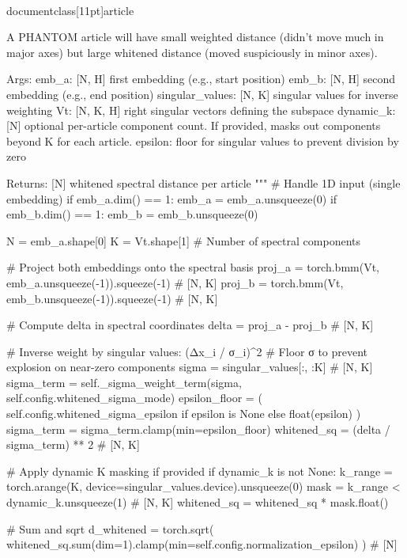 \\documentclass[11pt]{article}
\begin{document}
\begin{CodeBlock}
        A PHANTOM article will have small weighted distance (didn't move much in
        major axes) but large whitened distance (moved suspiciously in minor axes).

        Args:
            emb_a: [N, H] first embedding (e.g., start position)
            emb_b: [N, H] second embedding (e.g., end position)
            singular_values: [N, K] singular values for inverse weighting
            Vt: [N, K, H] right singular vectors defining the subspace
            dynamic_k: [N] optional per-article component count. If provided,
                       masks out components beyond K for each article.
            epsilon: floor for singular values to prevent division by zero

        Returns:
            [N] whitened spectral distance per article
        """
        # Handle 1D input (single embedding)
        if emb_a.dim() == 1:
            emb_a = emb_a.unsqueeze(0)
        if emb_b.dim() == 1:
            emb_b = emb_b.unsqueeze(0)

        N = emb_a.shape[0]
        K = Vt.shape[1]  # Number of spectral components

        # Project both embeddings onto the spectral basis
        proj_a = torch.bmm(Vt, emb_a.unsqueeze(-1)).squeeze(-1)  # [N, K]
        proj_b = torch.bmm(Vt, emb_b.unsqueeze(-1)).squeeze(-1)  # [N, K]

        # Compute delta in spectral coordinates
        delta = proj_a - proj_b  # [N, K]

        # Inverse weight by singular values: (Δx_i / σ_i)^2
        # Floor σ to prevent explosion on near-zero components
        sigma = singular_values[:, :K]  # [N, K]
        sigma_term = self._sigma_weight_term(sigma, self.config.whitened_sigma_mode)
        epsilon_floor = (
            self.config.whitened_sigma_epsilon if epsilon is None else float(epsilon)
        )
        sigma_term = sigma_term.clamp(min=epsilon_floor)
        whitened_sq = (delta / sigma_term) ** 2  # [N, K]

        # Apply dynamic K masking if provided
        if dynamic_k is not None:
            k_range = torch.arange(K, device=singular_values.device).unsqueeze(0)
            mask = k_range < dynamic_k.unsqueeze(1)  # [N, K]
            whitened_sq = whitened_sq * mask.float()

        # Sum and sqrt
        d_whitened = torch.sqrt(
            whitened_sq.sum(dim=1).clamp(min=self.config.normalization_epsilon)
        )  # [N]


\end{CodeBlock}
\end{document}
